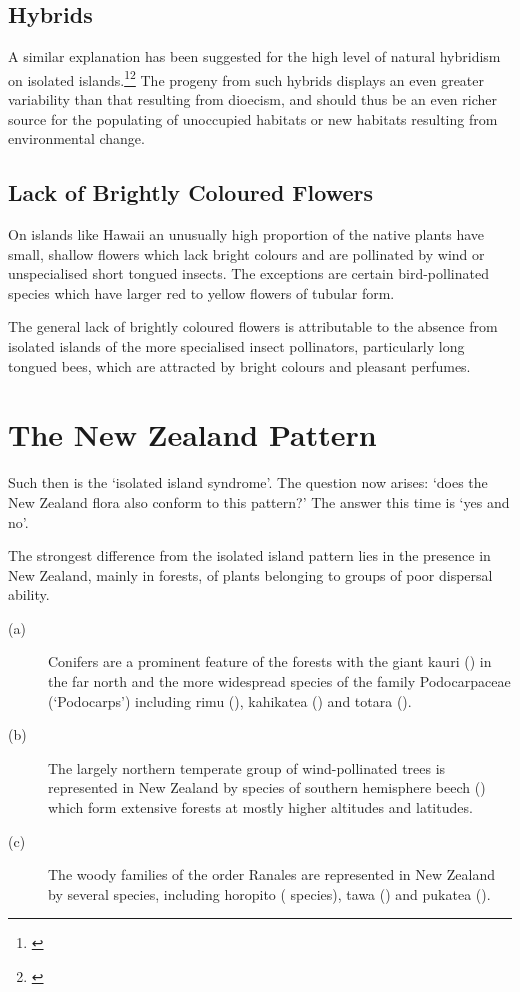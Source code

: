 \subsection{Hybrids}

A similar explanation has been suggested for the high level of natural hybridism on isolated islands.\footnote{\cite{gillett1972role}}\footnote{\cite{rattenbury1962cyclic}} The progeny from such hybrids displays an even greater variability than that resulting from dioecism, and should thus be an even richer source for the populating of unoccupied habitats or new habitats resulting from environmental change.

\subsection{Lack of Brightly Coloured Flowers}

On islands like Hawai{\okina}i an unusually high proportion of the native plants have small, shallow flowers which lack bright colours and are pollinated by wind or unspecialised short tongued insects.
The exceptions are certain bird-pollinated species which have larger red to yellow flowers of tubular form.

The general lack of brightly coloured flowers is attributable to the absence from isolated islands of the more specialised insect pollinators, particularly long tongued bees, which are attracted by bright colours and pleasant perfumes.

\section{The New Zealand Pattern}

Such then is the `isolated island syndrome'.
The question now arises: `does the New Zealand flora also conform to this pattern?' The answer this time is `yes and no'.

The strongest difference from the isolated island pattern lies in the presence in New Zealand, mainly in forests, of plants belonging to groups of poor dispersal ability.

\begin{description}
\item[{(a)}]Conifers are a prominent feature of the forests with the giant kauri () in the far north and the more widespread species of the family Podocarpaceae (`Podocarps') including rimu (), kahikatea () and totara ().
\item[{(b)}]The largely northern temperate group of wind-pollinated trees is represented in New Zealand by species of southern hemisphere beech () which form extensive forests at mostly higher altitudes and latitudes.
\item[{(c)}]The woody families of the order Ranales are represented in New Zealand by several species, including horopito ( species), tawa () and pukatea ().
\end{description}


